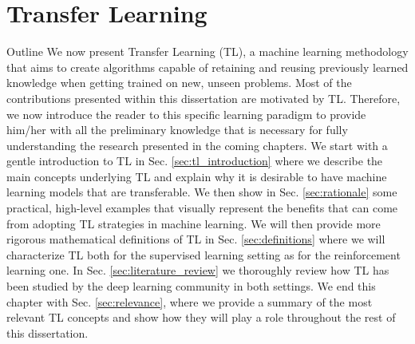 \chapter{Transfer Learning}
\label{ch:transfer_learning}

\begin{remark}{Outline}
	We now present Transfer Learning (TL), a machine learning methodology that aims to create algorithms capable of retaining and reusing previously learned knowledge when getting trained on new, unseen problems. Most of the contributions presented within this dissertation are motivated by TL. Therefore, we now introduce the reader to this specific learning paradigm to provide him/her with all the preliminary knowledge that is necessary for fully understanding the research presented in the coming chapters. We start with a gentle introduction to TL in Sec. \ref{sec:tl_introduction} where we describe the main concepts underlying TL and explain why it is desirable to have machine learning models that are transferable. We then show in Sec. \ref{sec:rationale} some practical, high-level examples that visually represent the benefits that can come from adopting TL strategies in machine learning. We will then provide more rigorous mathematical definitions of TL in Sec. \ref{sec:definitions} where we will characterize TL both for the supervised learning setting as for the reinforcement learning one. In Sec. \ref{sec:literature_review} we thoroughly review how TL has been studied by the deep learning community in both settings. We end this chapter with Sec. \ref{sec:relevance}, where we provide a summary of the most relevant TL concepts and show how they will play a role throughout the rest of this dissertation.  
\end{remark}

